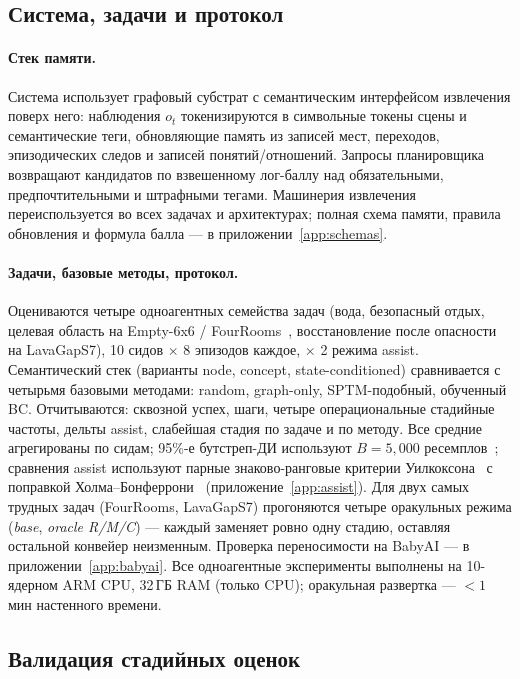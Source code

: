 \documentclass{article}
\begin{document}
\subsection{Система, задачи и протокол}
\label{sec:single-setup}

\paragraph{Стек памяти.}
Система использует графовый субстрат с семантическим интерфейсом извлечения поверх него: наблюдения $o_t$ токенизируются в символьные токены сцены и семантические теги, обновляющие память из записей мест, переходов, эпизодических следов и записей понятий/отношений. Запросы планировщика возвращают кандидатов по взвешенному лог-баллу над обязательными, предпочтительными и штрафными тегами. Машинерия извлечения переиспользуется во всех задачах и архитектурах; полная схема памяти, правила обновления и формула балла --- в приложении~\ref{app:schemas}.

\paragraph{Задачи, базовые методы, протокол.}
Оцениваются четыре одноагентных семейства задач (вода, безопасный отдых, целевая область на Empty-6x6 / FourRooms~\citep{sutton1999between}, восстановление после опасности на LavaGapS7), 10 сидов $\times$ 8 эпизодов каждое, $\times$ 2 режима assist. Семантический стек (варианты node, concept, state-conditioned) сравнивается с четырьмя базовыми методами: random, graph-only, SPTM-подобный, обученный BC. Отчитываются: сквозной успех, шаги, четыре операциональные стадийные частоты, дельты assist, слабейшая стадия по задаче и по методу. Все средние агрегированы по сидам; 95\%-е бутстреп-ДИ используют $B{=}5{,}000$ ресемплов~\citep{efron1979bootstrap}; сравнения assist используют парные знаково-ранговые критерии Уилкоксона~\citep{wilcoxon1945individual} с поправкой Холма--Бонферрони~\citep{holm1979simple} (приложение~\ref{app:assist}). Для двух самых трудных задач (FourRooms, LavaGapS7) прогоняются четыре оракульных режима (\emph{base}, \emph{oracle R/M/C}) --- каждый заменяет ровно одну стадию, оставляя остальной конвейер неизменным. Проверка переносимости на BabyAI --- в приложении~\ref{app:babyai}. Все одноагентные эксперименты выполнены на 10-ядерном ARM CPU, 32\,ГБ RAM (только CPU); оракульная развертка --- $<1$\,мин настенного времени.

\subsection{Валидация стадийных оценок}
\label{sec:validation}
\end{document}
